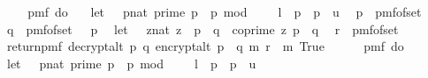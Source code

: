 \begin{isabellebody}
\ \isamarkupfalse%
\ {\isachardoublequoteopen}\isanewline
\ \ pmf\ {\isacharparenleft}{\kern0pt}do\ {\isacharbraceleft}{\kern0pt}\isanewline
\ \ let\ {\isasymK}\ {\isacharequal}{\kern0pt}\ {\isacharbraceleft}{\kern0pt}{\isacharparenleft}{\kern0pt}p{\isacharcolon}{\kern0pt}{\isacharcolon}{\kern0pt}nat{\isacharparenright}{\kern0pt}{\isachardot}{\kern0pt}\ prime\ p\ {\isasymand}\ p\ mod\ {}\ {\isacharequal}{\kern0pt}\ {}\ {\isasymand}\ l\ {\isasymle}\ p\ {\isasymand}\ p\ {\isasymle}\ u{\isacharbraceright}{\kern0pt}{\isacharsemicolon}{\kern0pt}\isanewline
\ \ p\ {\isasymleftarrow}\ pmf{\isacharunderscore}{\kern0pt}of{\isacharunderscore}{\kern0pt}set\ {\isasymK}{\isacharsemicolon}{\kern0pt}\ \isanewline
\ \ q\ {\isasymleftarrow}\ pmf{\isacharunderscore}{\kern0pt}of{\isacharunderscore}{\kern0pt}set\ {\isacharparenleft}{\kern0pt}{\isasymK}\ {\isacharminus}{\kern0pt}\ {\isacharbraceleft}{\kern0pt}p{\isacharbraceright}{\kern0pt}{\isacharparenright}{\kern0pt}{\isacharsemicolon}{\kern0pt}\isanewline
\ \ let\ {\isasymZ}\ {\isacharequal}{\kern0pt}\ {\isacharbraceleft}{\kern0pt}{\isacharparenleft}{\kern0pt}z{\isacharcolon}{\kern0pt}{\isacharcolon}{\kern0pt}nat{\isacharparenright}{\kern0pt}{\isachardot}{\kern0pt}\ z\ {\isacharless}{\kern0pt}\ p\ {\isacharasterisk}{\kern0pt}\ q\ {\isasymand}\ coprime\ z\ {\isacharparenleft}{\kern0pt}p\ {\isacharasterisk}{\kern0pt}\ q{\isacharparenright}{\kern0pt}{\isacharbraceright}{\kern0pt}{\isacharsemicolon}{\kern0pt}\isanewline
\ \ r\ {\isasymleftarrow}\ pmf{\isacharunderscore}{\kern0pt}of{\isacharunderscore}{\kern0pt}set\ {\isasymZ}{\isacharsemicolon}{\kern0pt}\isanewline
\ \ return{\isacharunderscore}{\kern0pt}pmf\ {\isacharparenleft}{\kern0pt}decrypt{\isacharunderscore}{\kern0pt}alt\ p\ q\ {\isacharparenleft}{\kern0pt}encrypt{\isacharunderscore}{\kern0pt}alt\ {\isacharparenleft}{\kern0pt}p\ {\isacharasterisk}{\kern0pt}\ q{\isacharparenright}{\kern0pt}\ m\ r{\isacharparenright}{\kern0pt}\ {\isacharequal}{\kern0pt}\ m{\isacharparenright}{\kern0pt}{\isacharbraceright}{\kern0pt}{\isacharparenright}{\kern0pt}\ True\isanewline
\ \ {\isacharequal}{\kern0pt}\ \isanewline
\ \ pmf\ {\isacharparenleft}{\kern0pt}do\ {\isacharbraceleft}{\kern0pt}\isanewline
\ \ let\ {\isasymK}\ {\isacharequal}{\kern0pt}\ {\isacharbraceleft}{\kern0pt}{\isacharparenleft}{\kern0pt}p{\isacharcolon}{\kern0pt}{\isacharcolon}{\kern0pt}nat{\isacharparenright}{\kern0pt}{\isachardot}{\kern0pt}\ prime\ p\ {\isasymand}\ p\ mod\ {}\ {\isacharequal}{\kern0pt}\ {}\ {\isasymand}\ l\ {\isasymle}\ p\ {\isasymand}\ p\ {\isasymle}\ u{\isacharbraceright}{\kern0pt}{\isacharsemicolon}{\kern0pt}\isanewline

\end{isabellebody}
